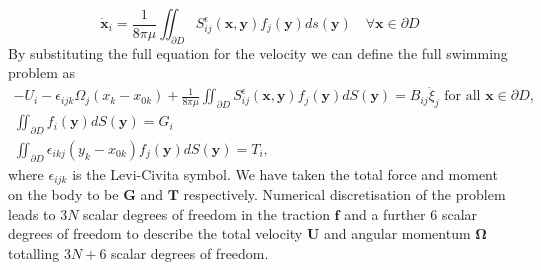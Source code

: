 \begin{equation*}
    \dot{\bm{x}}_i = \frac{1}{8 \pi \mu} \iint_{\partial D} S_{i j}^{\epsilon}\left(\bm{x}, \bm{y}\right) f_{j}(\bm{y}) d s(\bm{y}) \quad \forall \bm{x}\in\partial D
\end{equation*}
By substituting the full equation for the velocity we can define the full swimming problem as
\begin{equation}
\label{eq:swimmingProblem}
\begin{gathered}
    -U_{i}-\epsilon_{i j k} \Omega_{j}\left(x_{k}-x_{0 k}\right)+\frac{1}{8 \pi\mu} \iint_{\partial D} S_{i j}^{\epsilon}(\bm{x}, \bm{y}) f_{j}(\bm{y}) d S({\bm{y}})=B_{i j} \dot{\xi}_{j} \text { for all } \bm{x} \in \partial D, \\
    \iint_{\partial D} f_{i}(\bm{y}) d S({\bm{y}})=G_i \\
    \iint_{\partial D} \epsilon_{i k j} (y_{k}-x_{0 k}) f_{j}(\bm{y}) d S({\bm{y}})=T_i,
\end{gathered}
\end{equation}
where $\epsilon_{ijk}$ is the Levi-Civita symbol. We have taken the total force and moment on the body to be $\bm{G}$ and $\bm{T}$ respectively. Numerical discretisation of the problem leads to $3N$ scalar degrees of freedom in the traction $\bm{f}$ and a further $6$ scalar degrees of freedom to describe the total velocity $\bm{U}$ and angular momentum $\bm{\Omega}$ totalling $3N+6$ scalar degrees of freedom.


